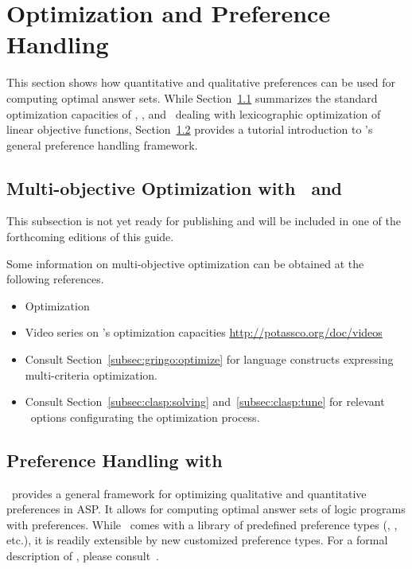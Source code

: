 
\section{Optimization and Preference Handling}
\label{sec:prefopt}

This section shows how quantitative and qualitative preferences can be used for computing optimal answer sets.
While Section~\ref{sec:optimization} summarizes the standard optimization capacities of \clasp, \gringo, and \clingo\
dealing with lexicographic optimization of linear objective functions,
Section~\ref{sec:asprin} provides a tutorial introduction to \asprin's general preference handling framework.

\subsection{Multi-objective Optimization with \clasp\ and \clingo}
\label{sec:optimization}

This subsection is not yet ready for publishing
and will be included in one of the forthcoming editions of this guide.

Some information on multi-objective optimization
can be obtained at the following references.

\begin{itemize}
\item Optimization \cite{gekakasc11b,gekakasc11c,gekasc11b,ankamasc12a}
\item Video series on \clasp's optimization capacities \url{http://potassco.org/doc/videos}
\item Consult Section~\ref{subsec:gringo:optimize} for language constructs expressing multi-criteria optimization.
\item Consult Section~\ref{subsec:clasp:solving} and~\ref{subsec:clasp:tune} for relevant \clasp\ options configurating the optimization process.
\end{itemize}

\subsection{Preference Handling with \asprin}\label{sec:asprin}
\asprin\ provides a general framework for optimizing qualitative and quantitative preferences in ASP.
It allows for computing optimal answer sets of logic programs with preferences.
While \asprin\ comes with a library of predefined preference types 
(\code{subset}, \code{pareto}, etc.),
it is readily extensible by new customized preference types.
For a formal description of \asprin, please consult~\cite{brderosc15a}.

